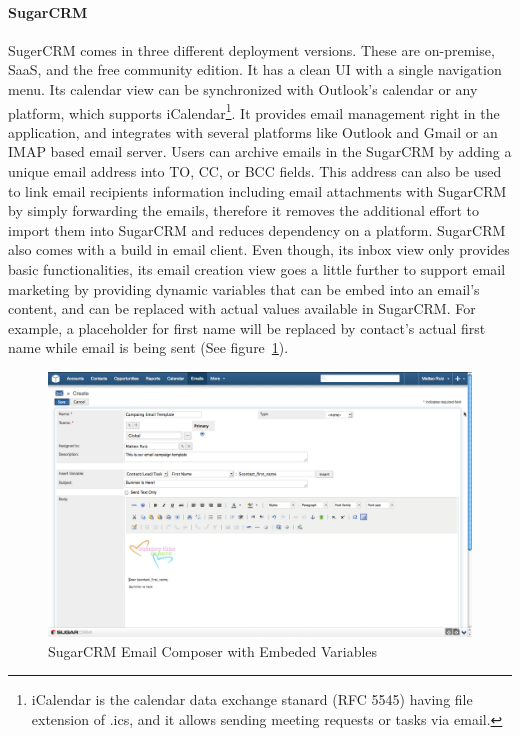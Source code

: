 \paragraph{SugarCRM}
SugerCRM comes in three different deployment versions. These are on-premise, \ac{SaaS}, and the free community edition. It has a clean \ac{UI} with a single navigation menu. Its calendar view can be synchronized with Outlook's calendar or any platform, which supports iCalendar\footnote{iCalendar is the calendar data exchange stanard (RFC 5545) having file extension of .ics, and it allows sending meeting requests or tasks via email.}. It provides email management right in the application, and integrates with several platforms like Outlook and Gmail or an \ac{IMAP} based email server. Users can archive emails in the SugarCRM by adding a unique email address into TO, \ac{CC}, or \ac{BCC} fields. This address can also be used to link email recipients information including email attachments with SugarCRM by simply forwarding the emails, therefore it removes the additional effort to import them into SugarCRM and reduces dependency on a platform. SugarCRM also comes with a build in email client. Even though, its inbox view only provides basic functionalities, its email creation view goes a little further to support email marketing by providing dynamic variables that can be embed into an email's content, and can be replaced with actual values available in SugarCRM. For example, a placeholder for first name will be replaced by contact's actual first name while email is being sent (See figure~\ref{fig:SugarCRM-Create_Email}). 
\vspace{1cm}

\begin{figure}[htbp]
	\centering
	\includegraphics[width=1.00\textwidth]{imgs/SugarCRM-Create_Email.png}
	\caption[SugarCRM Email Composer with Embeded Variables]{SugarCRM Email Composer with Embeded Variables \citep{SugarCRMInc.2013}}
	\label{fig:SugarCRM-Create_Email}
\end{figure}

